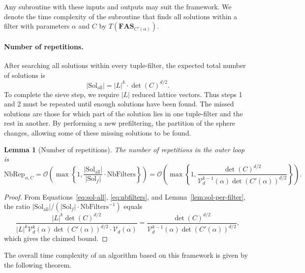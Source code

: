 \documentclass[10pt,a4paper]{article}
\newtheorem{lemma}[theorem]{Lemma}
\begin{document}
Any subroutine with these inputs and outputs may suit the framework. We denote the time complexity of the subroutine that finds all solutions within a filter with parameters \(\alpha\) and \(C\) by \(T(\mathbf{FAS}_{C'(\alpha)})\).

\paragraph{Number of repetitions.}
After searching all solutions within every tuple-filter, the expected total number of solutions is
\begin{equation}
|\mathrm{Sol}_{\mathrm{all}}| = |L|^k\cdot\det(C)^{d/2}.
\label{eq:sol-all}
\end{equation}
To complete the sieve step, we require \(|L|\) reduced lattice vectors. Thus steps 1 and 2 must be repeated until enough solutions have been found. The missed solutions are those for which part of the solution lies in one tuple-filter and the rest in another. By performing a new prefiltering, the partition of the sphere changes, allowing some of these missing solutions to be found.

\begin{lemma}[Number of repetitions]
\label{lem:repetitions}
The number of repetitions in the outer loop is
\begin{equation}
\mathrm{NbRep}_{\alpha,C} = \mathcal{O}\!\left(\max\left\{1,\frac{|\mathrm{Sol}_{\mathrm{all}}|}{|\mathrm{Sol}_f|}\cdot\mathrm{NbFilters}\right\}\right)
= \mathcal{O}\!\left(\max\left\{1,\frac{\det(C)^{d/2}}{\mathcal{V}_d^{k-1}(\alpha)\det(C'(\alpha))^{d/2}}\right\}\right).
\end{equation}
\end{lemma}

\begin{proof}
From Equations~\eqref{eq:sol-all}, \eqref{eq:nbfilters}, and Lemma~\ref{lem:sol-per-filter}, the ratio \(|\mathrm{Sol}_{\mathrm{all}}|/(|\mathrm{Sol}_f|\cdot\mathrm{NbFilters}^{-1})\) equals
\begin{equation}
\frac{|L|^k\det(C)^{d/2}}{|L|^k\mathcal{V}_d^k(\alpha)\det(C'(\alpha))^{d/2}\cdot\mathcal{V}_d(\alpha)}
= \frac{\det(C)^{d/2}}{\mathcal{V}_d^{k-1}(\alpha)\det(C'(\alpha))^{d/2}},
\end{equation}
which gives the claimed bound.
\end{proof}

The overall time complexity of an algorithm based on this framework is given by the following theorem.
\end{document}
